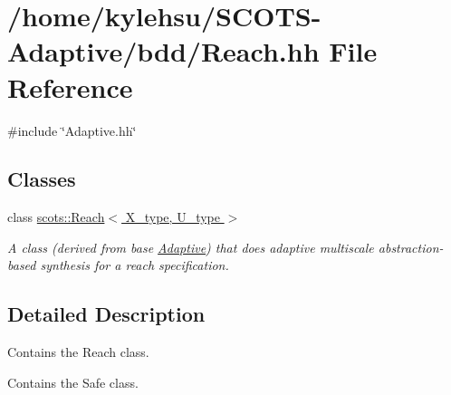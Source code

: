 \hypertarget{Reach_8hh}{}\section{/home/kylehsu/\+S\+C\+O\+T\+S-\/\+Adaptive/bdd/\+Reach.hh File Reference}
\label{Reach_8hh}
{\ttfamily \#include \char`\"{}Adaptive.\+hh\char`\"{}}\newline
\subsection*{Classes}
\begin{DoxyCompactItemize}
\item 
class \hyperlink{classscots_1_1Reach}{scots\+::\+Reach$<$ X\+\_\+type, U\+\_\+type $>$}
\begin{DoxyCompactList}\small\item\em A class (derived from base \hyperlink{classscots_1_1Adaptive}{Adaptive}) that does adaptive multiscale abstraction-\/based synthesis for a reach specification. \end{DoxyCompactList}\end{DoxyCompactItemize}


\subsection{Detailed Description}
Contains the Reach class.

Contains the Safe class. 